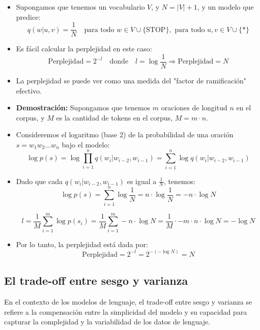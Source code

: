 \begin{itemize}
    \item Supongamos que tenemos un vocabulario $V$, y $N = |V| + 1$, y un modelo que predice:
    \[
        q(w|u, v) = \frac{1}{N} \quad \text{para todo } w \in V \cup \{\text{STOP}\}, \text{ para todo } u, v \in V \cup \{*\}
    \]
    \item Es fácil calcular la perplejidad en este caso:
    \[
        \text{Perplejidad} = 2^{-l} \quad \text{donde} \quad l = \log \frac{1}{N} \Rightarrow \text{Perplejidad} = N
    \]
    \item La perplejidad se puede ver como una medida del "factor de ramificación" efectivo.
    
    \item \textbf{Demostración:} Supongamos que tenemos $m$ oraciones de longitud $n$ en el corpus, y $M$ es la cantidad de tokens en el corpus, $M = m \cdot n$.
    
    \item Consideremos el logaritmo (base 2) de la probabilidad de una oración $s = w_1 w_2 \dots w_n$ bajo el modelo:
    \[
        \log p(s) = \log \prod_{i=1}^{n} q(w_i|w_{i-2}, w_{i-1}) = \sum_{i=1}^{n} \log q(w_i|w_{i-2}, w_{i-1})
    \]
    \item Dado que cada $q(w_i|w_{i-2}, w_{i-1})$ es igual a $\frac{1}{N}$, tenemos:
    \[
        \log p(s) = \sum_{i=1}^{n} \log \frac{1}{N} = n \cdot \log \frac{1}{N} = -n \cdot \log N
    \]
    
    
    \[
        l =  \frac{1}{M} \sum_{i=1}^{m} \log p(s_i) = \frac{1}{M} \sum_{i=1}^{m} -n \cdot \log N  = \frac{1}{M} \cdot -m \cdot n \cdot \log N = - \log N 
    \]
    
            
    \item Por lo tanto, la perplejidad está dada por:
    \[
        \text{Perplejidad} = 2^{-l} = 2^{-(- \log N)} = N
    \]
\end{itemize}



\subsection{El trade-off entre sesgo y varianza}

En el contexto de los modelos de lenguaje, el trade-off entre sesgo y varianza se refiere a la compensación entre la simplicidad del modelo y su capacidad para capturar la complejidad y la variabilidad de los datos de lenguaje.

